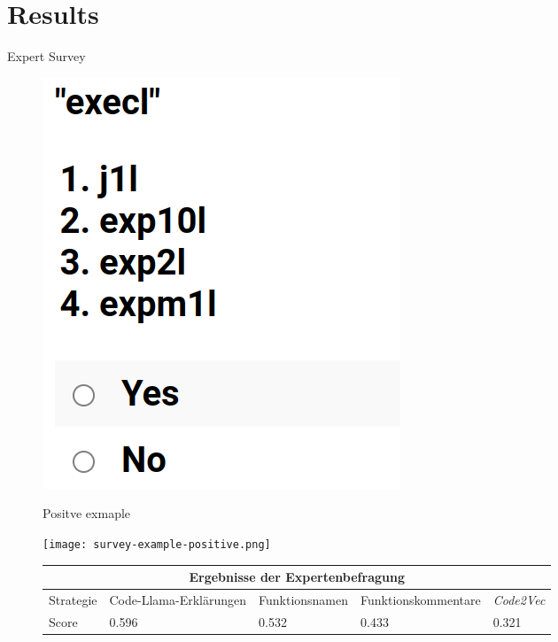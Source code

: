 \documentclass[aspectratio=1610,12pt]{beamer}
\begin{document}
\section{Results}
\begin{frame}[t]{Expert Survey}
    \begin{figure}
      \centering
      \begin{minipage}{0.45\textwidth}
          \centering
          \includegraphics[scale=0.2]{pictures/survey-example-negative.png}
          \caption{Positve exmaple}
      \end{minipage}
      \begin{minipage}{0.45\textwidth}
          \centering
          \texttt{[image: survey-example-positive.png]}
          \caption{Negative exmaple}
      \end{minipage}
      \begin{table}
        \begin{center}
          \scalebox{0.8} {
            \begin{tabular}{ |p{1.5cm}||p{4.5cm}|p{3.2cm}|p{4cm}|p{1.8cm}|  }
            \hline
            \multicolumn{5}{|c|}{Ergebnisse der Expertenbefragung} \\
            \hline
            Strategie & Code-Llama-Erklärungen & Funktionsnamen & Funktionskommentare & \textit{Code2Vec} \\
            \hline
            Score   & 0.596 & 0.532 & 0.433 & 0.321   \\
            \hline
            \end{tabular}
          }
        \end{center} 
      \end{table}
    \end{figure}
\end{frame}
\end{document}
